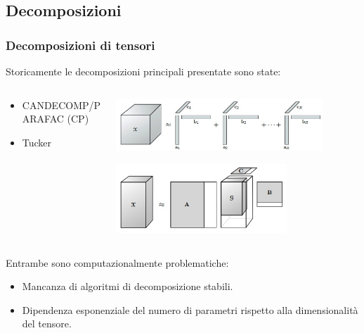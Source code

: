 \documentclass[compress]{beamer}
\theoremstyle{definition}
\theoremstyle{plain}
\begin{document}
\subsection{Decomposizioni}
\begin{frame}
\frametitle{Decomposizioni di tensori}
Storicamente le decomposizioni principali presentate sono state: 

\vspace{5mm}
\begin{columns}
\begin{column}{0.6\textwidth}
\begin{itemize}
\item CANDECOMP/PARAFAC (CP) %
	\vspace{3mm}
\item Tucker
\end{itemize}
\end{column}
\begin{column}{0.4\textwidth}
\includegraphics[width=0.85\textwidth]{Img/cp.jpg}

\includegraphics[width=0.7\textwidth]{Img/tucker.jpg}
\end{column}
\end{columns}

\vspace{5mm}
Entrambe sono computazionalmente problematiche:
\begin{itemize}
	\item Mancanza di algoritmi di decomposizione stabili.
	\item Dipendenza esponenziale del numero di parametri rispetto alla dimensionalità del tensore.
\end{itemize}
\end{frame}
\end{document}
